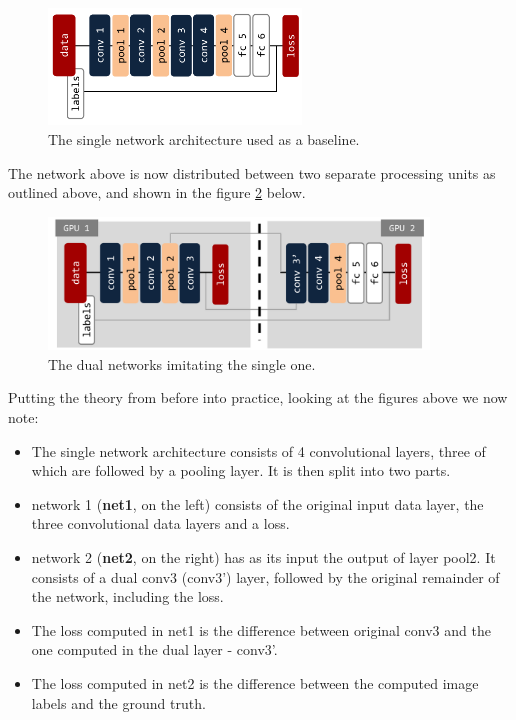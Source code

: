 \documentclass[a4paper, 11pt]{article}
\numberwithin{equation}{section}
\begin{document}
	\begin{figure}[!h]
		\centering
		\includegraphics[page=1,width=0.6\textwidth]{net12.pdf}
		\caption{\label{fig:net12pretty}{The single network architecture used as a baseline.}}
	\end{figure}
	
	The network above is now distributed between two separate processing units as outlined above, and shown in the figure \ref{fig:net12separate} below.
	
	\begin{figure}[!h]
		\centering
		\includegraphics[page=1,width=0.9\textwidth]{net12separate.pdf}
		\caption{\label{fig:net12separate}{The dual networks imitating the single one.}}
	\end{figure}
	
	Putting the theory from before into practice, looking at the figures above we now note:
	\begin{itemize}
		\item The single network architecture consists of 4 convolutional layers, three of which are followed by a pooling layer. It is then split into two parts.
		\item network 1 (\textbf{net1}, on the left) consists of the original input data layer, the three convolutional data layers and a loss.
		\item network 2 (\textbf{net2}, on the right) has as its input the output of layer pool2. It consists of a dual conv3 (conv3') layer, followed by the original remainder of the network, including the loss.
		\item The loss computed in net1 is the difference between original conv3 and the one computed in the dual layer - conv3'.
		\item The loss computed in net2 is the difference between the computed image labels and the ground truth.
	\end{itemize}
	
\end{document}

